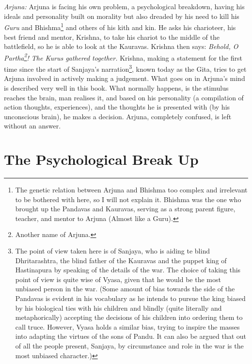 \documentclass{article}
\newcommand{\tit}[1]{\textit{#1}}
\begin{document}
\\\\\tit{Arjuna: } Arjuna is facing his own problem, a psychological breakdown, having his ideals and personality built on morality but also dreaded by his need to kill his \tit{Guru} and Bhishma\footnote[1]{The genetic relation between Arjuna and Bhishma too complex and irrelevant to be bothered with here, so I will not explain it. Bhishma was the one who brought up the Pandavas and Kauravas, serving as a strong parent figure, teacher, and mentor to Arjuna (Almost like a Guru).} and others of his kith and kin. He asks his charioteer, his best friend and mentor, Krishna, to take his chariot to the middle of the battlefield, so he is able to look at the Kauravas. Krishna then says: \tit{Behold, O Partha\footnote[2]{Another name of Arjuna.}! The Kurus gathered together.} Krishna, making a statement for the first time since the start of Sanjaya's narration\footnote[3]{The point of view taken here is of Sanjaya, who is aiding te blind Dhritarashtra, the blind father of the Kauravas and the puppet king of Hastinapura by speaking of the details of the war. The choice of taking this point of view is quite wise of Vyasa, given that he would be the most unbiased person in the war. (Some amount of bias towards the side of the Pandavas is evident in his vocabulary as he intends to pursue the king biased by his biological ties with his children and blindly (quite literally and metaphorically) accepting the decisions of his children into ordering them to call truce. However, Vyasa holds a similar bias, trying to inspire the masses into adapting the virtues of the sons of Pandu. It can also be argued that out of all the people present, Sanjaya, by circumstance and role in the war is the most unbiased character.)}, known today as the Gita, tries to get Arjuna involved in actively making a judgement. What goes on in Arjuna's mind is described very well in this book. What normally happens, is the stimulus reaches the brain, man realises it, and based on his personality (a compilation of action thoughts, experiences), and the thoughts he is presented with (by his unconscious brain), he makes a decision. Arjuna, completely confused, is left without an answer.
\newpage \section{The Psychological Break Up}
\end{document}
